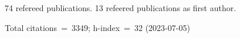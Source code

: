 74 refereed publications. 13 refeered publications as first author.

Total citations~=~3349; h-index~=~32 (2023-07-05)